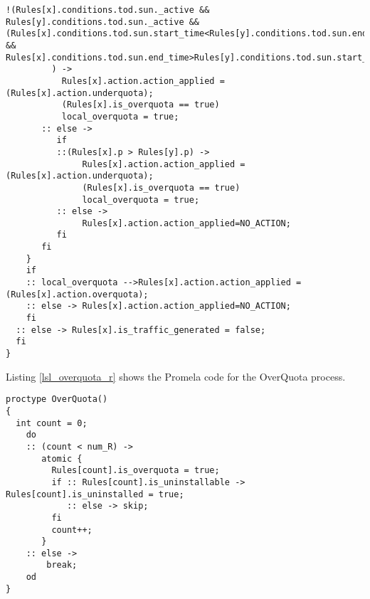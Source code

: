 \begin{lstlisting}[caption=PriorityChecker Process - Promela Code,
  label=lsl_prioritychecker_r]
         !(Rules[x].conditions.tod.sun._active && Rules[y].conditions.tod.sun._active && (Rules[x].conditions.tod.sun.start_time<Rules[y].conditions.tod.sun.end_time && Rules[x].conditions.tod.sun.end_time>Rules[y].conditions.tod.sun.start_time))
         ) -> 
           Rules[x].action.action_applied = (Rules[x].action.underquota);
           (Rules[x].is_overquota == true)
           local_overquota = true; 
       :: else ->
          if
          ::(Rules[x].p > Rules[y].p) ->
               Rules[x].action.action_applied = (Rules[x].action.underquota);
               (Rules[x].is_overquota == true)
               local_overquota = true;
          :: else -> 
               Rules[x].action.action_applied=NO_ACTION;                              
          fi
       fi
    }
    if
    :: local_overquota -->Rules[x].action.action_applied = (Rules[x].action.overquota);
    :: else -> Rules[x].action.action_applied=NO_ACTION; 
    fi          
  :: else -> Rules[x].is_traffic_generated = false;
  fi
}
\end{lstlisting}
\doublespacing

Listing  \ref{lsl_overquota_r} shows the Promela code for the OverQuota process.\\

\singlespacing
\begin{lstlisting}[caption=OverQuota Process - Promela Code,
  label=lsl_overquota_r]
proctype OverQuota()
{
  int count = 0;
	do
	:: (count < num_R) ->   
       atomic {
         Rules[count].is_overquota = true; 
         if :: Rules[count].is_uninstallable -> Rules[count].is_uninstalled = true;
            :: else -> skip;
         fi
         count++;
	   }
	:: else ->
		break;
	od
}
\end{lstlisting}
\doublespacing
